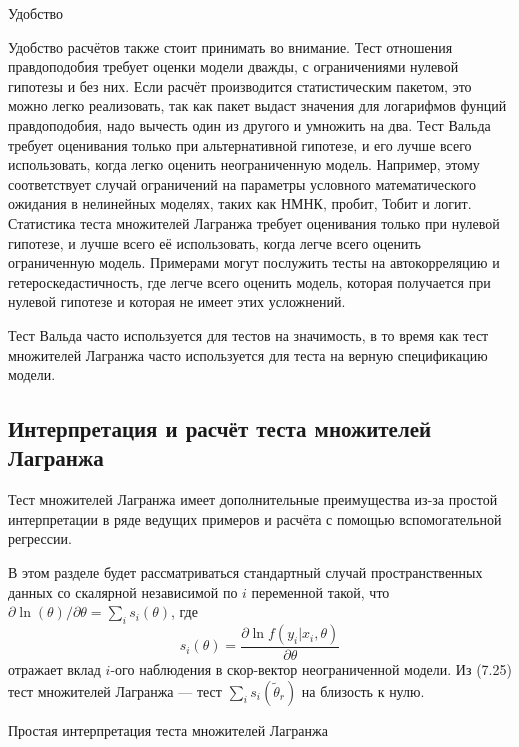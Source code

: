 \begin{center}
Удобство
\end{center}

Удобство расчётов также стоит принимать во внимание. Тест отношения правдоподобия требует оценки модели дважды, с ограничениями нулевой гипотезы и без них. Если расчёт производится статистическим пакетом, это можно легко реализовать, так как пакет выдаст значения для логарифмов фунций правдоподобия, надо вычесть один из другого и умножить на два. Тест Вальда требует оценивания только при альтернативной гипотезе, и его лучше всего использовать, когда легко оценить неограниченную модель. Например, этому соответствует случай ограничений на параметры условного математического ожидания в нелинейных моделях, таких как НМНК, пробит, Тобит и логит. Статистика теста множителей Лагранжа требует оценивания только при нулевой гипотезе, и лучше всего её использовать, когда легче всего оценить ограниченную модель. Примерами могут послужить тесты на автокорреляцию и гетероскедастичность, где легче всего оценить модель, которая получается при нулевой гипотезе и которая не имеет этих усложнений.

Тест Вальда часто используется для тестов на значимость, в то время как тест множителей Лагранжа часто используется для теста на верную спецификацию модели.

\subsection{Интерпретация и расчёт теста множителей Лагранжа}

Тест множителей Лагранжа имеет дополнительные преимущества из-за простой интерпретации в ряде ведущих примеров и расчёта с помощью вспомогательной регрессии.

В этом разделе будет рассматриваться стандартный случай пространственных данных со скалярной независимой по $i$ переменной такой, что $\partial{\ln(\theta)}/\partial{\theta} = \sum_i s_i(\theta)$, где 
\begin{equation}
s_i(\theta) = \frac{\partial{\ln f(y_i|x_i,\theta)}}{\partial{\theta}}
\end{equation}
отражает вклад $i$-ого наблюдения в скор-вектор неограниченной модели. Из (7.25) тест множителей Лагранжа --- тест $\sum_i s_i(\tilde{\theta}_r)$ на близость к нулю.

\begin{center}
Простая интерпретация теста множителей Лагранжа
\end{center}

